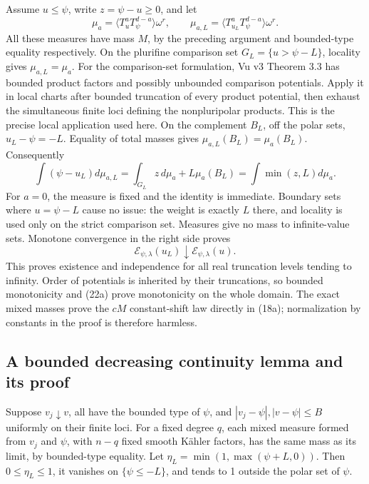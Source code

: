 \documentclass[
  11pt,
]{article}
\begin{document}
Assume \(u\leq\psi\), write \(z=\psi-u\geq0\), and let \[
\mu_a=\langle T_u^aT_\psi^{d-a}\rangle\omega^r,
\qquad
\mu_{a,L}=\langle T_{u_L}^aT_\psi^{d-a}\rangle\omega^r.
\] All these measures have mass \(M\), by the preceding argument and
bounded-type equality respectively. On the plurifine comparison set
\(G_L=\{u>\psi-L\}\), locality gives \(\mu_{a,L}=\mu_a\). For
the comparison-set formulation, Vu v3 Theorem 3.3 has bounded product
factors and possibly unbounded comparison potentials. Apply it in local
charts after bounded truncation of every product potential, then exhaust
the simultaneous finite loci defining the nonpluripolar products. This
is the precise local application used here. On the complement \(B_L\), off the polar sets,
\(u_L-\psi=-L\). Equality of total masses gives
\(\mu_{a,L}(B_L)=\mu_a(B_L)\). Consequently \[
\int(\psi-u_L)d\mu_{a,L}
=\int_{G_L}z\,d\mu_a+L\mu_a(B_L)
=\int\min(z,L)d\mu_a.
\tag{21a}
\] For \(a=0\), the measure is fixed and the identity is immediate.
Boundary sets where \(u=\psi-L\) cause no issue: the weight is exactly
\(L\) there, and locality is used only on the strict comparison set.
Measures give no mass to infinite-value sets. Monotone convergence in
the right side proves \[
\mathcal{E}_{\psi,\lambda}(u_L)\downarrow\mathcal{E}_{\psi,\lambda}(u).
\tag{22a}
\] This proves existence and independence for all real truncation levels
tending to infinity. Order of potentials is inherited by their
truncations, so bounded monotonicity and (22a) prove monotonicity on the
whole domain. The exact mixed masses prove the \(cM\) constant-shift law
directly in (18a); normalization by constants in the proof is therefore
harmless.

\subsection{A bounded decreasing continuity lemma and its
proof}\label{a-bounded-decreasing-continuity-lemma-and-its-proof}

Suppose \(v_j\downarrow v\), all have the bounded type of \(\psi\), and
\(|v_j-\psi|,|v-\psi|\leq B\) uniformly on their finite loci. For a
fixed degree \(q\), each mixed measure formed from \(v_j\) and \(\psi\),
with \(n-q\) fixed smooth Kähler factors, has the same mass as its
limit, by bounded-type equality. Let \(\eta_L=\min(1,\max(\psi+L,0))\).
Then \(0\leq\eta_L\leq1\), it vanishes on \(\{\psi\leq-L\}\), and tends
to 1 outside the polar set of \(\psi\).
\end{document}
